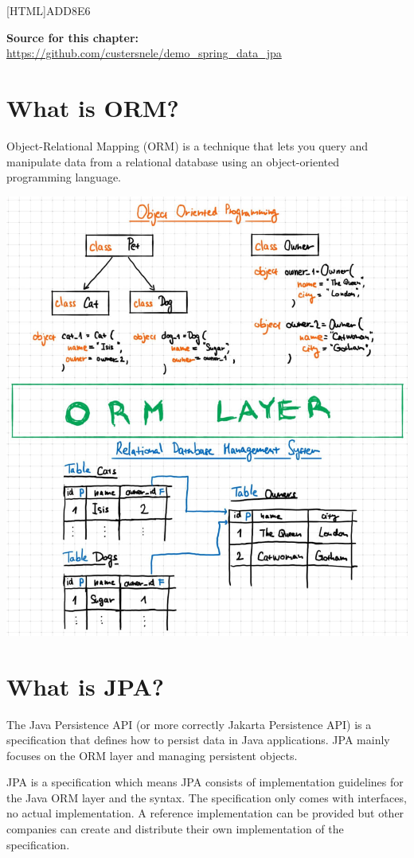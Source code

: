 [HTML]{ADD8E6}{\parbox{\textwidth}{%
\noindent \textbf{Source for this chapter:}\\
\url{https://github.com/custersnele/demo_spring_data_jpa}
}}

  
\section{What is ORM?}

Object-Relational Mapping (ORM) is a technique that lets you query and manipulate data from a relational database using an object-oriented programming language.

\includegraphics[width=\textwidth]{./images/jpa/orm}


\section{What is JPA?}

The Java Persistence API (or more correctly Jakarta Persistence API) is a specification that defines how to persist data in Java applications. JPA mainly focuses on the ORM layer and managing persistent objects.

JPA is a specification which means JPA consists of implementation guidelines for the Java ORM layer and the syntax. The specification only comes with interfaces, no actual implementation.  A reference implementation can be provided but other companies can create and distribute their own implementation of the specification.

